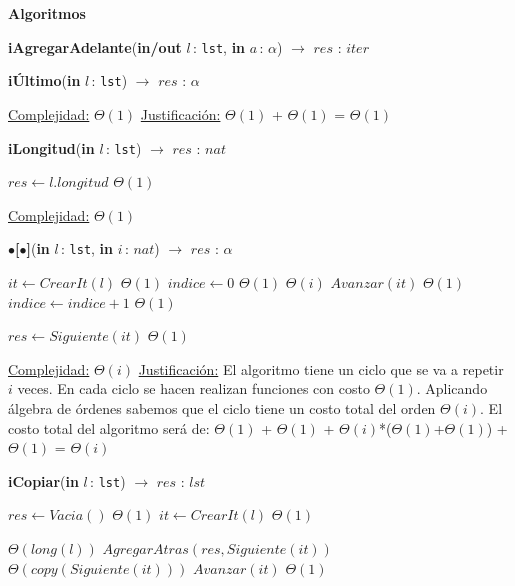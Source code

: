 \documentclass[a4paper,10pt]{article}
\let\TipoVariable=\texttt
\let\ModificadorArgumento=\textbf
\newcommand{\In}[2]{\ModificadorArgumento{in} \ensuremath{#1}\,: \TipoVariable{#2}\xspace}
\newcommand{\Inout}[2]{\ModificadorArgumento{in/out} \ensuremath{#1}\,: \TipoVariable{#2}\xspace}
\newenvironment{Algoritmos}{%
  \vspace*{2ex}%
  \noindent\textbf{\Large Algoritmos}%
  \vspace*{2ex}%
}{}
\begin{document}
\begin{Algoritmos}
\begin{







ithm}[H]{\textbf{iAgregarAdelante}(\Inout{l}{lst}, \In{a}{$\alpha$}) $\to$ $res$ : $iter$}
\begin{algorithm}[H]{\textbf{iÚltimo}(\In{l}{lst}) $\to$ $res$ : $\alpha$}
\begin{algorithmic}[1]
			\medskip
			\Statex \underline{Complejidad:} $\Theta(1)$
			\Statex \underline{Justificación:} $\Theta(1)$ + $\Theta(1)$ = $\Theta(1)$
    	\end{algorithmic}
\end{algorithm}	
	
\begin{algorithm}[H]{\textbf{iLongitud}(\In{l}{lst}) $\to$ $res$ : $nat$}	
	\begin{algorithmic}[1]
			 \State $res \gets l.longitud$	\Comment $\Theta(1)$ 
    	
		\medskip
		\Statex \underline{Complejidad:}  $\Theta(1)$
    \end{algorithmic}
\end{algorithm}	
	
\begin{algorithm}[H]{\textbf{$\bullet$[$\bullet$]}(\In{l}{lst}, \In{i}{$nat$}) $\to$ $res$ : $\alpha$}	
	\begin{algorithmic}[1]
			 \State $it \gets CrearIt(l)$		\Comment $\Theta(1)$
			 \State $indice \gets 0$		\Comment $\Theta(1)$
			 			\Comment $\Theta(i)$
			 	\State $Avanzar(it)$		\Comment $\Theta(1)$
				\State $indice \gets indice + 1$		\Comment $\Theta(1)$
			 \EndWhile
			 
			 \State $res \gets Siguiente(it)$		\Comment $\Theta(1)$
    	
		\medskip
		\Statex \underline{Complejidad:} $\Theta(i)$
		\Statex \underline{Justificación:} El algoritmo tiene un ciclo que se va a repetir $i$ veces. En cada ciclo se hacen realizan funciones con costo $\Theta(1)$. Aplicando álgebra de órdenes sabemos que el ciclo tiene un costo total del orden $\Theta(i)$. El costo total del algoritmo será de:  $\Theta(1)$ + $\Theta(1)$ + $\Theta(i)$*($\Theta(1)$+$\Theta(1)$) + $\Theta(1)$ = $\Theta(i)$
    \end{algorithmic}
\end{algorithm}	


\begin{algorithm}[H]{\textbf{iCopiar}(\In{l}{lst}) $\to$ $res$ : $lst$}	
	\begin{algorithmic}[1]
			\State $res \gets Vacia()$	\Comment $\Theta(1)$
			\State $it \gets CrearIt(l)$	\Comment $\Theta(1)$
			
			 	\Comment $\Theta(long(l))$
			 	\State $AgregarAtras(res, Siguiente(it))$	\Comment $\Theta(copy(Siguiente(it)))$
				\State $Avanzar(it)$	\Comment $\Theta(1)$
			\EndWhile
    	

\end{algorithmic}
\end{algorithm}
\end{







ithm}
\end{Algoritmos}
\end{document}
